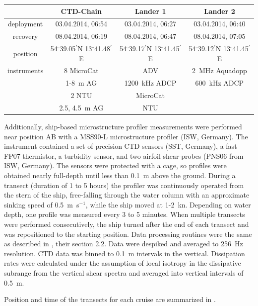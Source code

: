 \begin{table}
\begin{center}
\begin{tabular}{cccc}
& CTD-Chain & Lander 1 & Lander 2 \\
\hline
 deployment & 03.04.2014, 06:54 & 03.04.2014, 06:27 & 03.04.2014, 06:40 \\ 
 recovery & 08.04.2014, 06:19 & 08.04.2014, 06:47 & 08.04.2014, 07:05 \\
\hline
position & 54$^\circ$39.05$^\prime$N 13$^\circ$41.48$^\prime$E & 
54$^\circ$39.17$^\prime$N 13$^\circ$41.45$^\prime$E & 54$^\circ$39.12$^\prime$N 
13$^\circ$41.45$^\prime$E \\
\hline
instruments & 8 MicroCat & ADV & 2~MHz Aquadopp \\
 & 1-8~m AG & 1200~kHz ADCP & 600~kHz ADCP\\
 & 2 NTU & MicroCat & \\
 & 2.5, 4.5~m AG & NTU & \\
 \end{tabular}
\end{center}
\end{table}

Additionally, ship-based microstructure profiler measurements were performed 
near position AB with a MSS90-L microstructure profiler (ISW, Germany). The 
instrument contained a set of 
precision CTD sensors (SST, Germany), a fast FP07 thermistor, a turbidity 
sensor, and two airfoil shear-probes (PNS06 from ISW, Germany). The 
sensors were protected with a cage, so profiles were obtained nearly full-depth 
until less than 0.1~m above the ground. During a transect (duration of 1 to 5 
hours) the profiler was continuously operated from the stern of the ship, 
free-falling through the water column with an approximate sinking speed of 
0.5~m~s$^{-1}$, while the ship moved at 1-2~kn. Depending on water depth, one 
profile was measured every 3 to 5 minutes. When multiple transects 
were performed consecutively, the ship turned after the end of each transect 
and was repositioned to the starting position. 
Data processing routines were the same as described in \cite{vanderlee2011}, 
their section 2.2. Data were despiked and averaged to 256~Hz resolution. 
CTD data was binned to 0.1~m intervals in the vertical. Dissipation rates were 
calculated under the assumption of local isotropy in the dissipative subrange 
from the vertical shear spectra and averaged into vertical intervals of 0.5~m.

Position and time of the transects for each cruise are summarized in 
.

